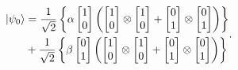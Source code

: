 \begin{equation}\label{eq:prodtenspsi0}
	\begin{split}
\ket{\psi_0} &= \frac{1}{\sqrt{2}}\left\{\alpha \begin{bmatrix}
1 \\
0 
\end{bmatrix} \left( \begin{bmatrix}
1 \\
0 
\end{bmatrix} \otimes \begin{bmatrix}
1 \\
0
\end{bmatrix} + \begin{bmatrix}
0 \\
1
\end{bmatrix} \otimes \begin{bmatrix}
0 \\
1
\end{bmatrix}\right)\right\} \\
&+ \frac{1}{\sqrt{2}}\left\{\beta \begin{bmatrix}
0 \\
1
\end{bmatrix} \left( \begin{bmatrix}
1 \\
0 
\end{bmatrix} \otimes \begin{bmatrix}
1 \\
0
\end{bmatrix} + \begin{bmatrix}
0 \\
1
\end{bmatrix} \otimes \begin{bmatrix}
0 \\
1
\end{bmatrix}\right)\right\}
	\end{split}.
\end{equation}

